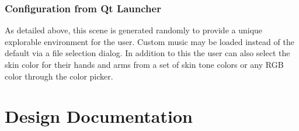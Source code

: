 \documentclass[a4paper,10pt]{article}
\begin{document}
\subsubsection{Configuration from Qt Launcher}
As detailed above, this scene is generated randomly to provide a unique explorable environment for the user. Custom music may be loaded instead of the default via a file selection dialog. In addition to this the user can also select the skin color for their hands and arms from a set of skin tone colors or any RGB color through the color picker.
\pagebreak

\section{Design Documentation}
\end{document}
